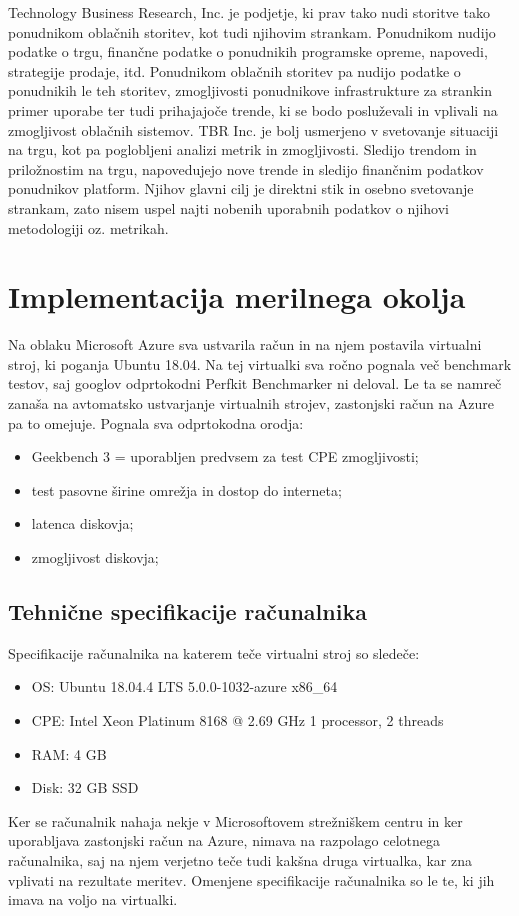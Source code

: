 Technology Business Research, Inc. je podjetje, ki prav tako nudi storitve tako ponudnikom oblačnih storitev, kot tudi njihovim strankam. Ponudnikom nudijo podatke o trgu, finančne podatke o ponudnikih programske opreme, napovedi, strategije prodaje, itd. Ponudnikom oblačnih storitev pa nudijo podatke o ponudnikih le teh storitev, zmogljivosti ponudnikove infrastrukture za strankin primer uporabe ter tudi prihajajoče trende, ki se bodo posluževali in vplivali na zmogljivost oblačnih sistemov.
TBR Inc. je bolj usmerjeno v svetovanje situaciji na trgu, kot pa poglobljeni analizi metrik in zmogljivosti. Sledijo trendom in priložnostim na trgu, napovedujejo nove trende in sledijo finančnim podatkov ponudnikov platform. Njihov glavni cilj je direktni stik in osebno svetovanje strankam, zato nisem uspel najti nobenih uporabnih podatkov o njihovi metodologiji oz. metrikah.


\section{Implementacija merilnega okolja}
Na oblaku Microsoft Azure sva ustvarila račun in na njem postavila virtualni stroj, ki poganja Ubuntu 18.04. Na tej virtualki sva ročno pognala več benchmark testov, saj googlov odprtokodni Perfkit Benchmarker ni deloval. Le ta se namreč zanaša na avtomatsko ustvarjanje virtualnih strojev, zastonjski račun na Azure pa to omejuje. Pognala sva odprtokodna orodja:
\begin{itemize}
\item Geekbench 3 = uporabljen predvsem za test CPE zmogljivosti;
\item  test pasovne širine omrežja in dostop do interneta;
\item  latenca diskovja;
\item  zmogljivost diskovja;
\end{itemize}

\subsection{Tehnične specifikacije računalnika}
Specifikacije računalnika na katerem teče virtualni stroj so sledeče:

\begin{itemize}
\item OS: Ubuntu 18.04.4 LTS 5.0.0-1032-azure x86\_64
\item CPE: Intel Xeon Platinum 8168 @ 2.69 GHz 1 processor, 2 threads
\item RAM: 4 GB
\item Disk: 32 GB SSD
\end{itemize}
Ker se računalnik nahaja nekje v Microsoftovem strežniškem centru in ker uporabljava zastonjski račun na Azure, nimava na razpolago celotnega računalnika, saj na njem verjetno teče tudi kakšna druga virtualka, kar zna vplivati na rezultate meritev. Omenjene specifikacije računalnika so le te, ki jih imava na voljo na virtualki.


